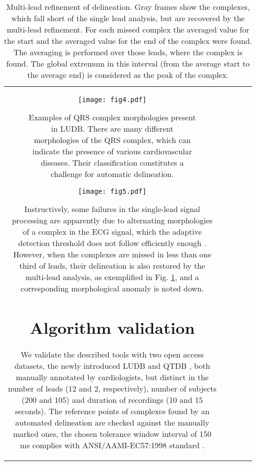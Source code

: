 \documentclass[submitted]{ieeeaccess}
\newcommand{\NewCorrection}[1]{{#1}}
\begin{document}
\begin{table}
\begin{tabular}{|c|c|c|c|c|}
\begin{figure}
    \centering
	\texttt{[image: fig4.pdf]}
	\caption{{Examples of QRS complex morphologies present in LUDB.}
		There are many different morphologies of the QRS complex, which can indicate the presence of various cardiovascular diseases. Their classification constitutes a challenge for automatic delineation.}
	\label{fig4}
\end{figure}


\begin{figure*}
    \centering
	\texttt{[image: fig5.pdf]}
	
	\caption{{Multi-lead refinement of delineation.}
		Gray frames show the complexes, which fall short of the single lead analysis, but are recovered by the multi-lead refinement. \NewCorrection{For each missed complex the averaged value for the start and the averaged value for the end of the complex were found. The averaging is performed over those leads, where the complex is found. The global extremum in this interval (from the average start to the average end) is considered as the peak of the complex.}}
	\label{fig5}
\end{figure*}


Instructively, some failures in the single-lead signal processing are apparently due to alternating morphologies of a complex in the ECG signal, which the adaptive detection threshold does not follow efficiently enough \cite{Kalyakulina2018}. However, when the complexes are missed in less than one third of leads, their delineation is also restored by the multi-lead analysis, as exemplified in Fig. \ref{fig5}, and a corresponding morphological anomaly is noted down. 


\section{Algorithm validation}\label{results}

We validate the described tools \cite{ECGKit,Kalyakulina2018} with two open access datasets, the newly introduced LUDB and QTDB \cite{qtdb}, both manually annotated by cardiologists, but distinct in the number of leads (12 and 2, respectively), number of subjects (200 and 105) and duration of recordings (10 and 15 seconds). The reference points of complexes found by an automated delineation are checked against the manually marked ones, the chosen tolerance window interval of 150 ms complies with ANSI/AAMI-EC57:1998 standard \cite{standart1999}.


\end{tabular}
\end{table}
\end{document}
